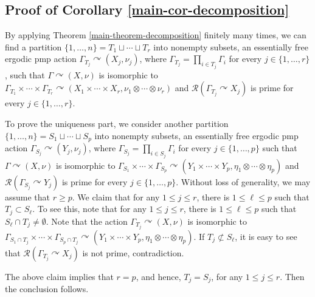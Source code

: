 \documentclass[11pt]{amsart}
\numberwithin{equation}{section}
\theoremstyle{plain}
\theoremstyle{definition}
\begin{document}
\subsection{Proof of Corollary \ref{main-cor-decomposition}}
By applying Theorem \ref{main-theorem-decomposition} finitely many times, we can find a partition $\{1, \dots, n\} = T_1 \sqcup \cdots \sqcup T_r$ into nonempty subsets, an essentially free ergodic pmp action $\Gamma_{T_j} \curvearrowright (X_j, \nu_j)$, where $\Gamma_{T_j} = \prod_{i \in T_j} \Gamma_i$ for every $j \in \{1, \dots, r\}$, such that $\Gamma \curvearrowright (X, \nu)$ is isomorphic to $\Gamma_{T_1} \times \cdots \times \Gamma_{T_r} \curvearrowright (X_1 \times \cdots \times X_r, \nu_1 \otimes \cdots \otimes \nu_r)$ and $\mathscr R(\Gamma_{T_j} \curvearrowright X_j)$ is prime for every $j \in \{1, \dots, r\}$.

To prove the uniqueness part, we consider another partition $\{1, \dots, n\} = S_1 \sqcup \cdots \sqcup S_p$ into nonempty subsets, an essentially free ergodic pmp action $\Gamma_{S_j} \curvearrowright (Y_j, \nu_j)$, where $\Gamma_{S_j} = \prod_{i \in S_j} \Gamma_i$ for every $j \in \{1, \dots, p\}$ such that $\Gamma \curvearrowright (X, \nu)$ is isomorphic to $\Gamma_{S_1} \times \cdots \times \Gamma_{S_p} \curvearrowright (Y_1 \times \cdots \times Y_p, \eta_1 \otimes \cdots \otimes \eta_p)$ and $\mathscr R(\Gamma_{S_j} \curvearrowright Y_j)$ is prime for every $j \in \{1, \dots, p\}$. Without loss of generality, we may assume that $r\ge p$. We claim that for any $1\leq j\leq r$, there is $1\leq \ell \leq p$ such that $T_j\subset S_\ell$. To see this, note that for any $1\leq j\leq r$, there is $1\leq \ell \leq p$ such that $S_\ell\cap T_j\neq\emptyset$. Note that the action $\Gamma_{T_j}\curvearrowright (X,\nu)$ is isomorphic to $\Gamma_{S_1\cap T_j} \times \cdots \times \Gamma_{S_p\cap T_j} \curvearrowright (Y_1 \times \cdots \times Y_p, \eta_1 \otimes \cdots \otimes \eta_p)$. If $T_j\not\subset S_\ell$, it is easy to see that $\mathscr R (\Gamma_{T_j}\curvearrowright X_j)$ is not prime, contradiction. 


The above claim implies that $r=p$, and hence, $T_j=S_j$, for any $1\leq j\leq r$. Then the conclusion follows.
\end{document}
